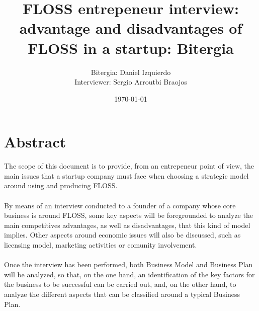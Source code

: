 \documentclass[11pt]{article}
\title{\textbf{FLOSS entrepeneur interview: advantage and disadvantages of FLOSS in a startup: Bitergia}}
\author{Bitergia: Daniel Izquierdo\\
Interviewer: Sergio Arroutbi Braojos}
\date{\today}
\newcounter{question}
\newcounter{answer}
\begin{document}
\newcommand\Que[1]{%
   \leavevmode\par
   \stepcounter{question}
   \noindent
   Q\thequestion. #1\par}
   
\newcommand\Ans[1]{%
   \stepcounter{answer}
   \noindent
   A\thequestion. #1\par}
   
\maketitle

\tableofcontents

\pagebreak

\section{Abstract}
The scope of this document is to provide, from an entrepeneur point of view, the main issues that a startup company must face when choosing a strategic model around using and producing FLOSS.\\
\\
By means of an interview conducted to a founder of a company whose core business is around FLOSS, some key aspects will be foregrounded to analyze the main competitives advantages, as well as disadvantages, that this kind of model implies. Other aspects around economic issues will also be discussed, such as licensing model, marketing activities or comunity involvement.\\
\\
Once the interview has been performed, both Business Model and Business Plan will be analyzed, so that, on the one hand, an identification of the key factors for the business to be successful can be carried out, and, on the other hand, to analyze the different aspects that can be classified around a typical Business Plan.
\end{document}
